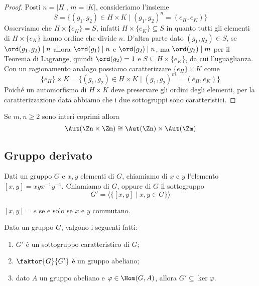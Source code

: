 \documentclass[11pt]{scrartcl}
\begin{document}
\begin{proof}
    Posti $n = |H|$, $m = |K|$, consideriamo l'insieme
    \[
        S = \{(g_1, g_2) \in H\times K\mid (g_1, g_2)^n = (e_H, e_K)\}\]
    Osserviamo che $H\times \{e_K\} = S$, infatti 
    $H\times \{e_K\} \subseteq S$ in quanto tutti gli elementi di $H\times\{e_K\}$
    hanno ordine che divide $n$. D'altra parte dato $(g_1, g_2) \in S$, se
    $\ord(g_1, g_2) \mid n$ allora $\ord(g_1)\mid n$ e $\ord(g_2)\mid n$, ma 
    $\ord(g_2) \mid m$ per il Teorema di Lagrange, quindi $\ord(g_2) = 1$ e
    $S \subseteq H\times\{e_K\}$, da cui l'uguaglianza. Con un ragionamento
    analogo possiamo caratterizzare $\{e_H\} \times K$ come 
    \[
        \{e_H\} \times K = \{(g_1, g_2) \in H\times K\mid (g_1, g_2)^m = (e_H, e_K)\}
    \] Poiché un automorfismo di $H\times K$ deve preservare gli ordini degli
    elementi, per la caratterizzazione data abbiamo che i due sottogruppi sono
    caratteristici.
\end{proof}

\begin{corollary}
    Se $m, n \geqslant 2$ sono interi coprimi allora
    \[
        \Aut(\Zn\times\Zm) \cong \Aut(\Zn)\times \Aut(\Zm)
    \]
\end{corollary}

\newpage

\subsection{Gruppo derivato}

\begin{definition}
    Dati un gruppo $G$ e $x, y$ elementi di $G$, chiamiamo 
    di $x$ e $y$ l'elemento $[x, y] = xyx^{-1}y^{-1}$. Chiamiamo  di $G$, oppure  di $G$
     il sottogruppo 
    \[
        G' = \langle\{[x, y]\mid x, y \in G\}\rangle
    \]
\end{definition}

\begin{remark}
    $[x, y] = e$ se e solo se $x$ e $y$ commutano.
\end{remark}

\begin{proposition}
    \label{prop1.35}
    Dato un gruppo $G$, valgono i seguenti fatti:
    \begin{enumerate}[(1)]
        \item $G'$ è un sottogruppo caratteristico di $G$;
        \item $\faktor{G}{G'}$ è un gruppo abeliano;
        \item dato $A$ un gruppo abeliano e $\varphi \in \Hom(G, A)$,
        allora $G' \subseteq \ker\varphi$.
    \end{enumerate}
\end{proposition}
\end{document}
